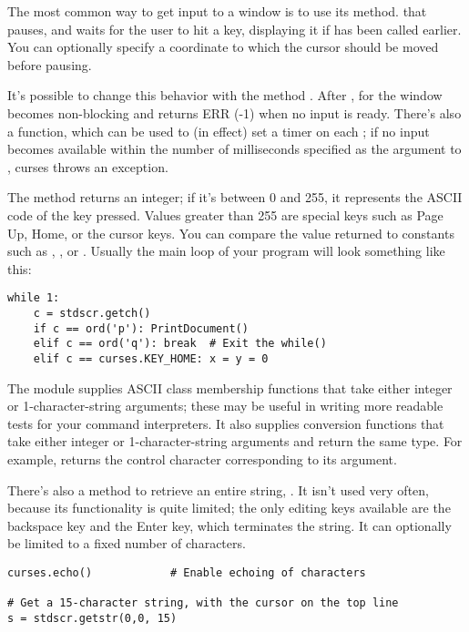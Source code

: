 \documentclass{howto}
\begin{document}
The most common way to get input to a window is to use its
 method. that pauses, and waits for the user to hit
a key, displaying it if  has been called earlier.
You can optionally specify a coordinate to which the cursor should be
moved before pausing.

It's possible to change this behavior with the method
. After ,  for
the window becomes non-blocking and returns ERR (-1) when no input is
ready.  There's also a  function, which can be
used to (in effect) set a timer on each ; if no input
becomes available within the number of milliseconds specified as the
argument to , curses throws an exception.

The  method returns an integer; if it's between 0 and
255, it represents the ASCII code of the key pressed.  Values greater
than 255 are special keys such as Page Up, Home, or the cursor keys.
You can compare the value returned to constants such as
, , or
.  Usually the main loop of your program
will look something like this:

\begin{verbatim}
while 1:
    c = stdscr.getch()
    if c == ord('p'): PrintDocument()
    elif c == ord('q'): break  # Exit the while()
    elif c == curses.KEY_HOME: x = y = 0
\end{verbatim}

The  module supplies ASCII class membership
functions that take either integer or 1-character-string
arguments; these may be useful in writing more readable tests for
your command interpreters.  It also supplies conversion functions 
that take either integer or 1-character-string arguments and return
the same type.  For example,  returns
the control character corresponding to its argument.

There's also a method to retrieve an entire string,
.  It isn't used very often, because its
functionality is quite limited; the only editing keys available are
the backspace key and the Enter key, which terminates the string.  It
can optionally be limited to a fixed number of characters.

\begin{verbatim}
curses.echo()            # Enable echoing of characters

# Get a 15-character string, with the cursor on the top line 
s = stdscr.getstr(0,0, 15)  
\end{verbatim}
\end{document}
